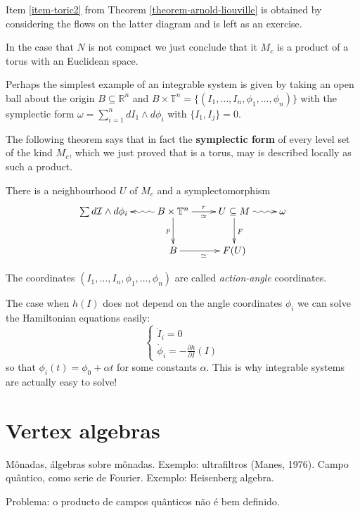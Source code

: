 \noindent
Item \ref{item-toric2} from Theorem \ref{theorem-arnold-liouville}
is obtained by considering the flows
on the latter diagram and is left as an exercise.

\noindent
In the case that $N$ is not compact we just conclude that
it $M_c$ is a product of a torus with an Euclidean space.

Perhaps the simplest example of an integrable system
is given by taking an open ball about the origin $B \subseteq \mathbb{R}^n$
and $B \times \mathbb{T}^n=\{(I_1,\ldots,I_n,\phi_1,\ldots,\phi_n)\}$ 
with the symplectic form $\omega=\sum_{i=1}^n dI_1 \wedge d\phi_i$ 
with $\{I_1,I_j\}=0$.

The following theorem says that in fact the {\bf symplectic form} of every
level set of the kind $M_c$, which we just proved
that is a torus, may is described locally as such a product.

\begin{theorem}
\label{theorem-local}
There is a neighbourhood $U$ of $M_c$ and
a symplectomorphism
$$
\xymatrix{
\sum d \mathcal{I} \wedge d\phi_i&\ar@{~>}[l]
B \times \mathbb{T}^n\ar[r]^{r}_{\simeq}\ar[d]_{p}&U \subseteq M\ar[d]^{F}
\ar@{~>}[r]
& \omega\\
&B\ar[r]_{\simeq}&F(U)
}
$$
\end{theorem}

\noindent
The coordinates $(I_1,\ldots,I_n,\phi_1,\ldots,\phi_n)$
are called {\it action-angle} coordinates.

The case when $h(I)$ does not depend on the angle coordinates $\phi_i$
we can solve the Hamiltonian equations easily:
$$
\begin{cases}
\dot I_i=0 \\
\dot \phi_i=-\frac{\partial h}{\partial I}(I)
\end{cases}
$$
so that $\phi_i(t)=\phi_0+\alpha t$ for some constants $\alpha$.
This is why integrable systems are actually easy to solve!

\section{Vertex algebras}
\label{section-vertex-algebras}

Mônadas, álgebras sobre mônadas. Exemplo: ultrafiltros (Manes, 1976). Campo
quântico, como serie de Fourier. Exemplo: Heisenberg algebra.

Problema: o producto de campos quânticos não é bem definido.






